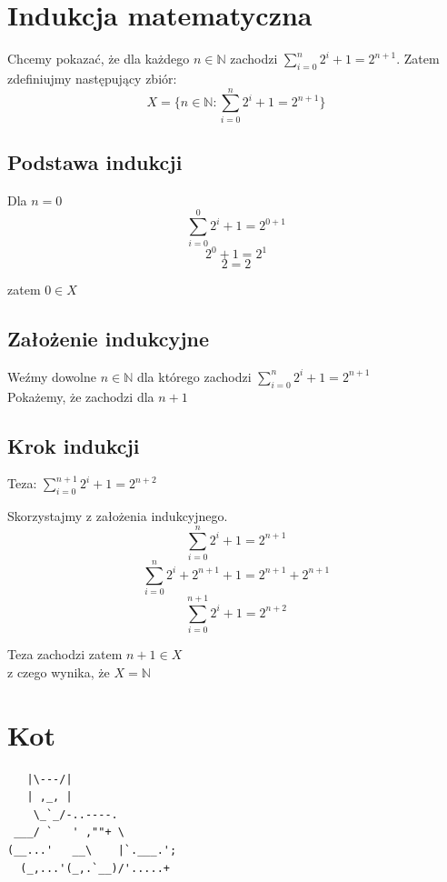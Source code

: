 \documentclass[a4paper]{article}
\begin{document}
\section{Indukcja matematyczna}\label{prelimeracja}
Chcemy pokazać, że dla każdego $n \in \mathbb{N}$ zachodzi $\sum_{i=0}^n 2^i + 1 = 2^{n+1}$. Zatem zdefiniujmy następujący zbiór:
\[
X = \{n \in \mathbb{N} : \sum_{i=0}^n 2^i + 1 = 2^{n+1}\}
\]

\subsection{Podstawa indukcji}
Dla $n = 0$
\[
\sum_{i=0}^0 2^i + 1 = 2^{0+1}
\]
\[
2^0 + 1 = 2^1
\]
\[
2 = 2
\]

zatem $0 \in X$

\subsection{Założenie indukcyjne}

Weźmy dowolne $n \in \mathbb{N}$ dla którego zachodzi $\sum_{i=0}^n 2^i + 1 = 2^{n+1}$\\
Pokażemy, że zachodzi dla $n+1$

\subsection{Krok indukcji}

Teza: $\sum_{i=0}^{n+1} 2^i + 1 = 2^{n+2}$

Skorzystajmy z założenia indukcyjnego.
\[
\sum_{i=0}^n 2^i + 1 = 2^{n+1}
\]
\[
\sum_{i=0}^n 2^i + 2^{n+1} + 1 = 2^{n+1} + 2^{n+1}
\]
\[
\sum_{i=0}^{n+1} 2^i + 1 = 2^{n+2}
\]

Teza zachodzi zatem $n+1 \in X$\\
z czego wynika, że $X=\mathbb{N}$

\section{Kot}

\begin{verbatim}
   |\---/|
   | ,_, |
    \_`_/-..----.
 ___/ `   ' ,""+ \ 
(__...'   __\    |`.___.';
  (_,...'(_,.`__)/'.....+
\end{verbatim}
\end{document}
